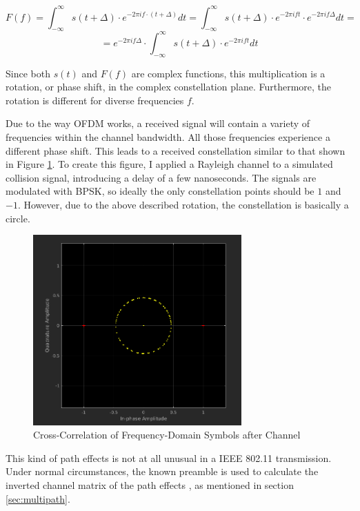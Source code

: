 $$ F(f) = \int_{-\infty}^{\infty} s(t + \Delta) \cdot e^{-2 \pi i f \cdot (t + \Delta)} dt = \int_{-\infty}^{\infty} s(t + \Delta) \cdot e^{-2 \pi i f t} \cdot e^{-2 \pi i f \Delta} dt = $$
$$ = e^{-2 \pi i f \Delta} \cdot \int_{-\infty}^{\infty} s(t + \Delta) \cdot e^{-2 \pi i f t} dt $$\vspace{0cm}

Since both $ s(t) $ and $ F(f) $ are complex functions, this multiplication is a rotation, or phase shift, in the complex constellation plane. Furthermore, the rotation is different for diverse frequencies $ f $.

Due to the way \gls{OFDM} works, a received signal will contain a variety of frequencies within the channel bandwidth. All those frequencies experience a different phase shift. This leads to a received constellation similar to that shown in Figure \ref{fig:freqd-corr}. To create this figure, I applied a Rayleigh channel \cite{sklar1997} to a simulated collision signal, introducing a delay of a few nanoseconds. The signals are modulated with \gls{BPSK}, so ideally the only constellation points should be $ 1 $ and $ -1 $. However, due to the above described rotation, the constellation is basically a circle.

\begin{figure}[ht]
	\centering
	\includegraphics[width=8cm]{gfx/images/freqd-correlation}
	\caption{Cross-Correlation of Frequency-Domain Symbols after Channel}
	\label{fig:freqd-corr}
\end{figure}

This kind of path effects is not at all unusual in a IEEE 802.11 transmission. Under normal circumstances, the known preamble is used to calculate the inverted channel matrix of the path effects \cite{perahia2013}, as mentioned in section \ref{sec:multipath}.\\

